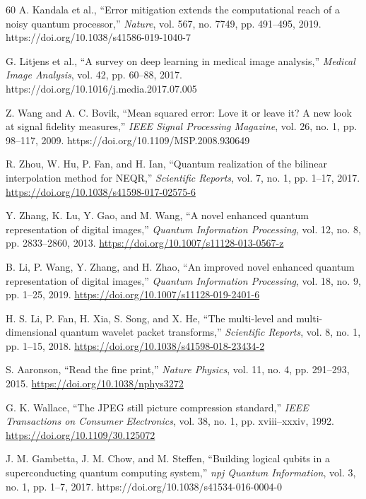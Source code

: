 \documentclass[11pt,a4paper]{article}
\begin{document}
\begin{thebibliography}{60}
A. Kandala et al., ``Error mitigation extends the computational reach of a noisy quantum processor,'' \textit{Nature}, vol. 567, no. 7749, pp. 491--495, 2019. https://doi.org/10.1038/s41586-019-1040-7

G. Litjens et al., ``A survey on deep learning in medical image analysis,'' \textit{Medical Image Analysis}, vol. 42, pp. 60--88, 2017. https://doi.org/10.1016/j.media.2017.07.005

Z. Wang and A. C. Bovik, ``Mean squared error: Love it or leave it? A new look at signal fidelity measures,'' \textit{IEEE Signal Processing Magazine}, vol. 26, no. 1, pp. 98--117, 2009. https://doi.org/10.1109/MSP.2008.930649

R. Zhou, W. Hu, P. Fan, and H. Ian, ``Quantum realization of the bilinear interpolation method for NEQR,'' \textit{Scientific Reports}, vol. 7, no. 1, pp. 1--17, 2017. \url{https://doi.org/10.1038/s41598-017-02575-6}

Y. Zhang, K. Lu, Y. Gao, and M. Wang, ``A novel enhanced quantum representation of digital images,'' \textit{Quantum Information Processing}, vol. 12, no. 8, pp. 2833--2860, 2013. \url{https://doi.org/10.1007/s11128-013-0567-z}

B. Li, P. Wang, Y. Zhang, and H. Zhao, ``An improved novel enhanced quantum representation of digital images,'' \textit{Quantum Information Processing}, vol. 18, no. 9, pp. 1--25, 2019. \url{https://doi.org/10.1007/s11128-019-2401-6}

H. S. Li, P. Fan, H. Xia, S. Song, and X. He, ``The multi-level and multi-dimensional quantum wavelet packet transforms,'' \textit{Scientific Reports}, vol. 8, no. 1, pp. 1--15, 2018. \url{https://doi.org/10.1038/s41598-018-23434-2}

S. Aaronson, ``Read the fine print,'' \textit{Nature Physics}, vol. 11, no. 4, pp. 291--293, 2015. \url{https://doi.org/10.1038/nphys3272}


G. K. Wallace, ``The JPEG still picture compression standard,'' \textit{IEEE Transactions on Consumer Electronics}, vol. 38, no. 1, pp. xviii--xxxiv, 1992. \url{https://doi.org/10.1109/30.125072}

J. M. Gambetta, J. M. Chow, and M. Steffen, ``Building logical qubits in a superconducting quantum computing system,'' \textit{npj Quantum Information}, vol. 3, no. 1, pp. 1--7, 2017. https://doi.org/10.1038/s41534-016-0004-0


\end{thebibliography}
\end{document}
